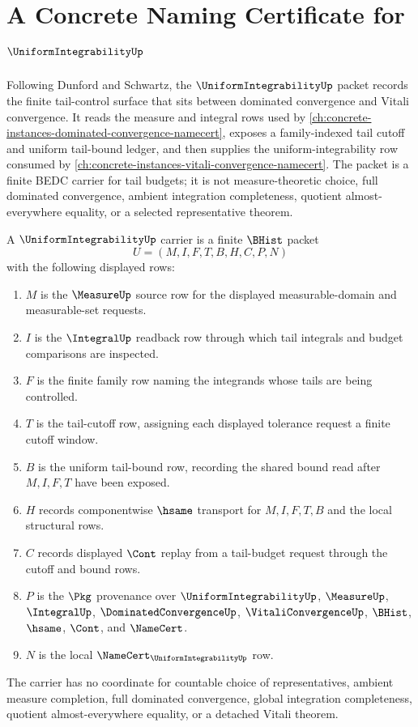 \chapter{A Concrete Naming Certificate for $\UniformIntegrabilityUp$}
\label{ch:concrete-instances-uniform-integrability-namecert}

Following Dunford and Schwartz, the $\UniformIntegrabilityUp$ packet records the finite tail-control surface that sits between dominated convergence and Vitali convergence. It reads the measure and integral rows used by \autoref{ch:concrete-instances-dominated-convergence-namecert}, exposes a family-indexed tail cutoff and uniform tail-bound ledger, and then supplies the uniform-integrability row consumed by \autoref{ch:concrete-instances-vitali-convergence-namecert}. The packet is a finite BEDC carrier for tail budgets; it is not measure-theoretic choice, full dominated convergence, ambient integration completeness, quotient almost-everywhere equality, or a selected representative theorem.

\begin{definition}
\label{def:uniform-integrability-carrier}
A $\UniformIntegrabilityUp$ carrier is a finite $\BHist$ packet
$$
U=(M,I,F,T,B,H,C,P,N)
$$
with the following displayed rows:
\begin{enumerate}
\item $M$ is the $\MeasureUp$ source row for the displayed measurable-domain and measurable-set requests.
\item $I$ is the $\IntegralUp$ readback row through which tail integrals and budget comparisons are inspected.
\item $F$ is the finite family row naming the integrands whose tails are being controlled.
\item $T$ is the tail-cutoff row, assigning each displayed tolerance request a finite cutoff window.
\item $B$ is the uniform tail-bound row, recording the shared bound read after $M,I,F,T$ have been exposed.
\item $H$ records componentwise $\hsame$ transport for $M,I,F,T,B$ and the local structural rows.
\item $C$ records displayed $\Cont$ replay from a tail-budget request through the cutoff and bound rows.
\item $P$ is the $\Pkg$ provenance over $\UniformIntegrabilityUp$, $\MeasureUp$, $\IntegralUp$, $\DominatedConvergenceUp$, $\VitaliConvergenceUp$, $\BHist$, $\hsame$, $\Cont$, and $\NameCert$.
\item $N$ is the local $\NameCert_{\UniformIntegrabilityUp}$ row.
\end{enumerate}
The carrier has no coordinate for countable choice of representatives, ambient measure completion, full dominated convergence, global integration completeness, quotient almost-everywhere equality, or a detached Vitali theorem.
\end{definition}

